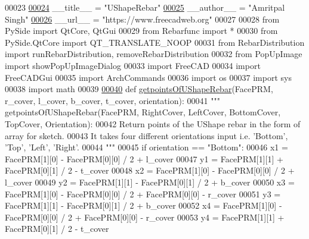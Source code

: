 \begin{DoxyCode}
00023 
\hypertarget{UShapeRebar_8py_source.tex_l00024}{}\hyperlink{namespaceUShapeRebar_ada77465e981ba03265231173a2645e0b}{00024} \_\_title\_\_ = \textcolor{stringliteral}{"UShapeRebar"}
\hypertarget{UShapeRebar_8py_source.tex_l00025}{}\hyperlink{namespaceUShapeRebar_a97e2ec9c8f01fe19bd22095b5aef9c29}{00025} \_\_author\_\_ = \textcolor{stringliteral}{"Amritpal Singh"}
\hypertarget{UShapeRebar_8py_source.tex_l00026}{}\hyperlink{namespaceUShapeRebar_a7684dab24892bce1b6ca80c35d20f159}{00026} \_\_url\_\_ = \textcolor{stringliteral}{"https://www.freecadweb.org"}
00027 
00028 \textcolor{keyword}{from} PySide \textcolor{keyword}{import} QtCore, QtGui
00029 \textcolor{keyword}{from} Rebarfunc \textcolor{keyword}{import} *
00030 \textcolor{keyword}{from} PySide.QtCore \textcolor{keyword}{import} QT\_TRANSLATE\_NOOP
00031 \textcolor{keyword}{from} RebarDistribution \textcolor{keyword}{import} runRebarDistribution, removeRebarDistribution
00032 \textcolor{keyword}{from} PopUpImage \textcolor{keyword}{import} showPopUpImageDialog
00033 \textcolor{keyword}{import} FreeCAD
00034 \textcolor{keyword}{import} FreeCADGui
00035 \textcolor{keyword}{import} ArchCommands
00036 \textcolor{keyword}{import} os
00037 \textcolor{keyword}{import} sys
00038 \textcolor{keyword}{import} math
00039 
\hypertarget{UShapeRebar_8py_source.tex_l00040}{}\hyperlink{namespaceUShapeRebar_ac12ae9bce6b5211759f2fff4091b0221}{00040} \textcolor{keyword}{def }\hyperlink{namespaceUShapeRebar_ac12ae9bce6b5211759f2fff4091b0221}{getpointsOfUShapeRebar}(FacePRM, r\_cover, l\_cover, b\_cover, t\_cover, orientation):
00041     \textcolor{stringliteral}{""" getpointsOfUShapeRebar(FacePRM, RightCover, LeftCover, BottomCover, TopCover, Orientation):}
00042 \textcolor{stringliteral}{    Return points of the UShape rebar in the form of array for sketch.}
00043 \textcolor{stringliteral}{    It takes four different orientations input i.e. 'Bottom', 'Top', 'Left', 'Right'.}
00044 \textcolor{stringliteral}{    """}
00045     \textcolor{keywordflow}{if} orientation == \textcolor{stringliteral}{"Bottom"}:
00046         x1 = FacePRM[1][0] - FacePRM[0][0] / 2 + l\_cover
00047         y1 = FacePRM[1][1] + FacePRM[0][1] / 2 - t\_cover
00048         x2 = FacePRM[1][0] - FacePRM[0][0] / 2 + l\_cover
00049         y2 = FacePRM[1][1] - FacePRM[0][1] / 2 + b\_cover
00050         x3 = FacePRM[1][0] - FacePRM[0][0] / 2 + FacePRM[0][0] - r\_cover
00051         y3 = FacePRM[1][1] - FacePRM[0][1] / 2 + b\_cover
00052         x4 = FacePRM[1][0] - FacePRM[0][0] / 2 + FacePRM[0][0] - r\_cover
00053         y4 = FacePRM[1][1] + FacePRM[0][1] / 2 - t\_cover

\end{DoxyCode}
